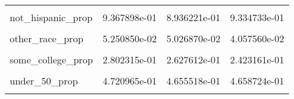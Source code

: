 \begin{table}[H]
\begin{tabular}[t]{lrrr}
\cellcolor{gray!6}{not\_employed\_prop} & \cellcolor{gray!6}{2.813838e-01} & \cellcolor{gray!6}{2.717372e-01} & \cellcolor{gray!6}{2.739005e-01}\\
not\_hispanic\_prop & 9.367898e-01 & 8.936221e-01 & 9.334733e-01\\
\cellcolor{gray!6}{not\_married\_prop} & \cellcolor{gray!6}{3.736758e-01} & \cellcolor{gray!6}{3.622825e-01} & \cellcolor{gray!6}{3.728014e-01}\\
other\_race\_prop & 5.250850e-02 & 5.026870e-02 & 4.057560e-02\\
\addlinespace
\cellcolor{gray!6}{over\_50\_prop} & \cellcolor{gray!6}{3.549637e-01} & \cellcolor{gray!6}{3.485165e-01} & \cellcolor{gray!6}{3.596021e-01}\\
some\_college\_prop & 2.802315e-01 & 2.627612e-01 & 2.423161e-01\\
\cellcolor{gray!6}{under\_30\_prop} & \cellcolor{gray!6}{1.729398e-01} & \cellcolor{gray!6}{1.859317e-01} & \cellcolor{gray!6}{1.745255e-01}\\
under\_50\_prop & 4.720965e-01 & 4.655518e-01 & 4.658724e-01\\
\cellcolor{gray!6}{white\_prop} & \cellcolor{gray!6}{8.368603e-01} & \cellcolor{gray!6}{8.255947e-01} & \cellcolor{gray!6}{8.129196e-01}\\
\bottomrule
\end{tabular}
\end{table}

